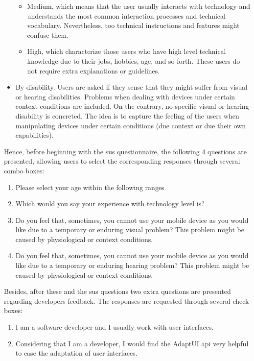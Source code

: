 \begin{itemize}
\begin{itemize}
    \item Medium, which means that the user usually interacts with technology
    and understands the most common interaction processes and technical 
    vocabulary. Nevertheless, too technical instructions and features might 
    confuse them.
    
    \item High, which characterize those users who have high level technical
    knowledge due to their jobs, hobbies, age, and so forth. These users do not require
    extra explanations or guidelines.
  \end{itemize}
  
  \item By disability. Users are asked if they sense that they might suffer from
  visual or hearing disabilities. Problems when dealing with devices under 
  certain context conditions are included. On the contrary, no specific visual 
  or hearing disability is concreted. The idea is to capture the feeling of 
  the users when manipulating devices under certain conditions (due context 
  or due their own capabilities).
\end{itemize}

Hence, before beginning with the \ac{sus} questionnaire, the following 4 questions
are presented, allowing users to select the corresponding responses through
several combo boxes:

\begin{enumerate}[label=\alph*)]
  \item Please select your age within the following ranges.
  \item Which would you say your experience with technology level is?
  \item Do you feel that, sometimes, you cannot use your mobile device as you
  would like due to a temporary or enduring visual problem? This problem might
  be caused by physiological or context conditions.
  \item Do you feel that, sometimes, you cannot use your mobile device as you
  would like due to a temporary or enduring hearing problem? This problem might
  be caused by physiological or context conditions.
\end{enumerate}

Besides, after these and the \ac{sus} questions two extra questions are presented
regarding developers feedback. The responses are requested through several
check boxes:

\begin{enumerate}[label=\alph*)]
  \item I am a software developer and I usually work with user interfaces.
  \item Considering that I am a developer, I would find the AdaptUI \ac{api} very
  helpful to ease the adaptation of user interfaces.
\end{enumerate}


